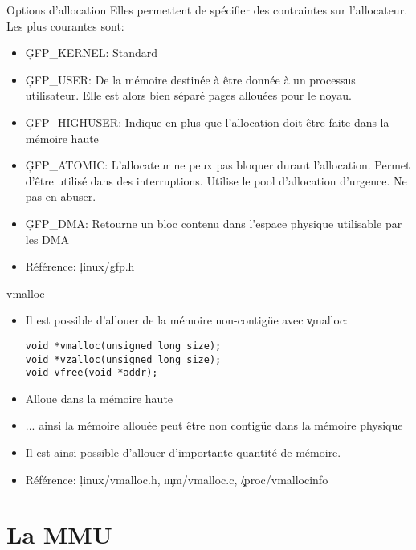 \begin{frame}[fragile=singleslide]{Options d'allocation}
  Elles permettent de spécifier  des contraintes sur l'allocateur. Les
  plus courantes sont:
  \begin{itemize} 
  \item \c{GFP_KERNEL}: Standard
  \item  \c{GFP_USER}: De  la  mémoire  destinée à  être  donnée à  un
    processus utilisateur.  Elle est alors bien  séparé pages allouées
    pour le noyau.
  \item \c{GFP_HIGHUSER}:  Indique en plus que  l'allocation doit être
    faite dans la mémoire haute
  \item  \c{GFP_ATOMIC}:  L'allocateur  ne  peux  pas  bloquer  durant
    l'allocation.      Permet     d'être     utilisé      dans     des
    interruptions. Utilise  le pool d'allocation d'urgence.  Ne pas en
    abuser.
  \item \c{GFP_DMA}:  Retourne un bloc contenu  dans l'espace physique
    utilisable par les DMA
  \item Référence: \c{linux/gfp.h}
  \end{itemize} 
\end{frame} 

\begin{frame}[fragile=singleslide]{vmalloc}
  \begin{itemize} 
  \item Il est possible d'allouer de la mémoire non-contigüe avec
    \c{vmalloc}:
    \begin{lstlisting} 
void *vmalloc(unsigned long size);
void *vzalloc(unsigned long size);
void vfree(void *addr);
    \end{lstlisting} 
  \item Alloue dans la mémoire haute
  \item ...  ainsi la mémoire allouée  peut être non  contigüe dans la
    mémoire physique
  \item  Il  est ainsi  possible  d'allouer  d'importante quantité  de
    mémoire.
  \item Référence: \c{linux/vmalloc.h}, \c{mm/vmalloc.c}, \c{/proc/vmallocinfo}
  \end{itemize} 
\end{frame}

\section{La MMU}

